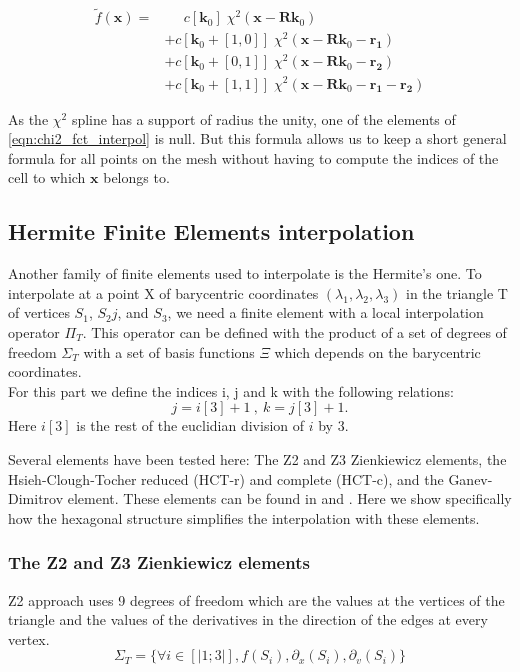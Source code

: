 \documentclass[proc]{edpsmath}
\begin{document}
\begin{align}
\label{eqn:chi2_fct_interpol}
\tilde{f}(\mathbf{x}) =& \;\;\;\;\; c[\mathbf{k}_0] \; \chi^2(\mathbf{x} - \mathbf{R}\mathbf{k}_0) \nonumber\\
	&+ c[\mathbf{k}_0 +[1,0]]\; \chi^2(\mathbf{x} - \mathbf{R}\mathbf{k}_0 - \mathbf{r_1}) \nonumber\\
	&+ c[\mathbf{k}_0 +[0,1]]\; \chi^2(\mathbf{x} - \mathbf{R}\mathbf{k}_0 - \mathbf{r_2}) \nonumber\\
	&+ c[\mathbf{k}_0 +[1,1]]\; \chi^2(\mathbf{x} - \mathbf{R}\mathbf{k}_0 - \mathbf{r_1} - \mathbf{r_2})
\end{align}

\rmrk  As the $\chi^2$ spline has a support of radius the unity, one of the elements of \eqref{eqn:chi2_fct_interpol} is null. But this formula allows us to keep a short general formula for all points on the mesh without having to compute the indices of the cell to which $\mathbf{x}$ belongs to.


\subsection{Hermite Finite Elements interpolation}

Another family of finite elements used to interpolate is the Hermite's one.
To interpolate at a point X of barycentric coordinates $(\lambda_1,\lambda_2,\lambda_3)$ in the triangle T of vertices $S_1$, $S_2j$, and $S_3$, we need a finite element with a local interpolation operator $\Pi_T $. This operator can be defined with the product of a set of degrees of freedom $\Sigma_T$ with a set of basis functions $\Xi$ which depends on the barycentric coordinates.\\
For this part we define the indices i, j and k with the following relations:
\begin{equation*}
j=i[3]+1 ~,~ k=j[3]+1.
\end{equation*}  
Here $i[3]$ is the rest of the euclidian division of $i$ by $3$.

Several elements have been tested here:
The Z2 and Z3 Zienkiewicz elements, the Hsieh-Clough-Tocher reduced (HCT-r) and complete (HCT-c), and the Ganev-Dimitrov element. These elements can be found in \cite{z} and \cite{b1} . Here we show specifically how the hexagonal structure simplifies the interpolation with these elements.\\

\subsubsection{The Z2 and Z3 Zienkiewicz elements}
Z2 approach uses 9 degrees of freedom which are the values at the vertices of the triangle and the values of the derivatives in the direction of the edges at every vertex.
\begin{equation*}
 \Sigma_T = \lbrace \forall i \in [|1;3|], f(S_i),\partial_x(S_i),\partial_v(S_i) \rbrace 
\end{equation*}
\end{document}
